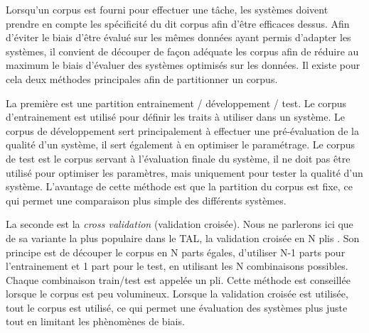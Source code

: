 \documentclass[PhD-Yoann-Dupont.tex]{subfiles}
\begin{document}
Lorsqu'un corpus est fourni pour effectuer une tâche, les systèmes doivent prendre en compte les spécificité du dit corpus afin d'être efficaces dessus. Afin d'éviter le biais d'être évalué sur les mêmes données ayant permis d'adapter les systèmes, il convient de découper de façon adéquate les corpus afin de réduire au maximum le biais d'évaluer des systèmes optimisés sur les données. Il existe pour cela deux méthodes principales afin de partitionner un corpus.

La première est une partition entrainement / développement / test. Le corpus d'entrainement est utilisé pour définir les traits à utiliser dans un système. Le corpus de développement sert principalement à effectuer une pré-évaluation de la qualité d'un système, il sert également à en optimiser le paramétrage. Le corpus de test est le corpus servant à l'évaluation finale du système, il ne doit pas être utilisé pour optimiser les paramètres, mais uniquement pour tester la qualité d'un système. L'avantage de cette méthode est que la partition du corpus est fixe, ce qui permet une comparaison plus simple des différents systèmes.

La seconde est la \textit{cross validation} (validation croisée). Nous ne parlerons ici que de sa variante la plus populaire dans le TAL, la validation croisée en N plis \citep{geisser1975predictive}. Son principe est de découper le corpus en N parts égales, d'utiliser N-1 parts pour l'entrainement et 1 part pour le test, en utilisant les N combinaisons possibles. Chaque combinaison train/test est appelée un pli. Cette méthode est conseillée lorsque le corpus est peu volumineux. Lorsque la validation croisée est utilisée, tout le corpus est utilisé, ce qui permet une évaluation des systèmes plus juste tout en limitant les phènomènes de biais.
\end{document}

